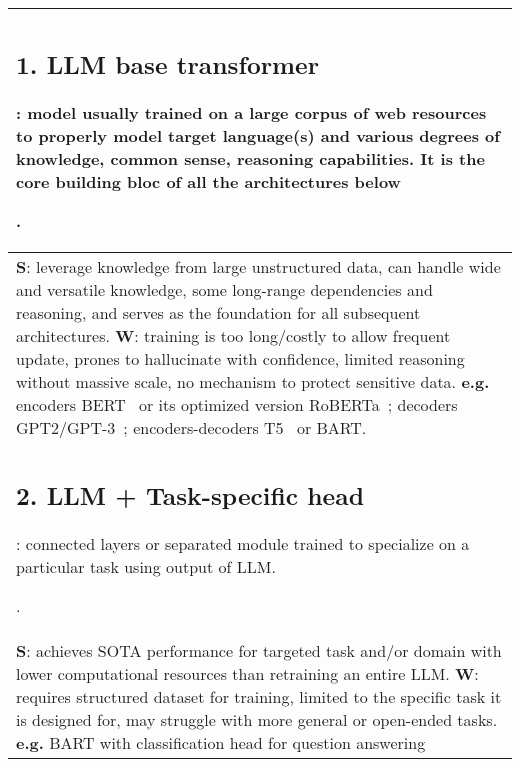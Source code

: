\documentclass[acmsmall]{acmart}
\begin{document}
\vspace{-4mm} %
{
\begin{longtable}{p{1\linewidth}}
\label{Table2LLMArchPatterns}\\


{\subsection{1. LLM base transformer}\label{HP1}:
model usually trained on a large corpus of web resources to properly model target language(s) and various degrees of knowledge, common sense, reasoning capabilities. It is the core building bloc of all the architectures below}. \\\midrule
{\textbf{S}: leverage knowledge from large unstructured data, can handle wide and versatile knowledge, some long-range dependencies and reasoning, and serves as the foundation for all subsequent architectures.
 \newline \textbf{W}:} training is too long/costly to allow frequent update, prones to hallucinate with confidence, limited reasoning without massive scale, no mechanism to protect sensitive data.
 \newline \textbf{e.g.} encoders BERT~\citep{devlinBERTPretrainingDeep2019} or its optimized version RoBERTa~\citep{liuRoBERTaRobustlyOptimized2019}; decoders GPT2/GPT-3~\citep{brownLanguageModelsAre2020}; encoders-decoders T5~\citep{raffelExploringLimitsTransfer2020} or BART. \\\midrule

{\subsection{2. LLM + Task-specific head}\label{HP2}:
connected layers or separated module trained to specialize on a particular task using output of LLM.}. \\\midrule
{\textbf{S}: achieves SOTA performance for targeted task and/or domain with lower computational resources than retraining an entire LLM.    
 \newline \textbf{W}:} requires structured dataset for training, limited to the specific task it is designed for, may struggle with more general or open-ended tasks.
 \newline \textbf{e.g.} BART with classification head for question answering~\citep{lewisBARTDenoisingSequencetoSequence2019} \\\midrule


\end{longtable}}
\end{document}

